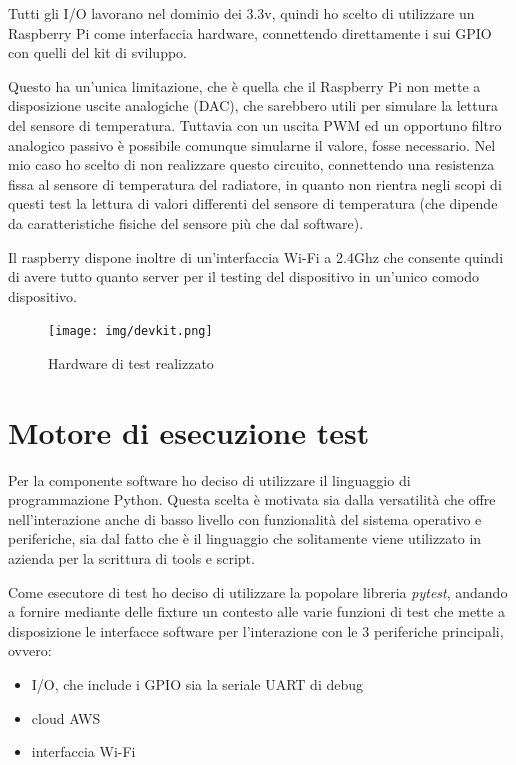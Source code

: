 \documentclass[12pt,a4paper,twoside,titlepage]{book}
\begin{document}
Tutti gli I/O lavorano nel dominio dei 3.3v, quindi ho scelto di utilizzare un
Raspberry Pi come interfaccia hardware, connettendo direttamente i sui GPIO con
quelli del kit di sviluppo.

Questo ha un'unica limitazione, che è quella che il Raspberry Pi non mette a disposizione
uscite analogiche (DAC), che sarebbero utili per simulare la lettura del sensore di
temperatura. Tuttavia con un uscita PWM ed un opportuno filtro analogico passivo è
possibile comunque simularne il valore, fosse necessario. Nel mio caso ho scelto di
non realizzare questo circuito, connettendo una resistenza fissa al sensore di
temperatura del radiatore, in quanto non rientra negli scopi di questi test la lettura
di valori differenti del sensore di temperatura (che dipende da caratteristiche fisiche
del sensore più che dal software).

Il raspberry dispone inoltre di un'interfaccia Wi-Fi a 2.4Ghz che consente quindi di
avere tutto quanto server per il testing del dispositivo in un'unico comodo dispositivo.

\begin{figure}
    \centering
    \texttt{[image: img/devkit.png]}
    \caption{Hardware di test realizzato}
    \label{fig:quadretto}
\end{figure}

\section{Motore di esecuzione test}

Per la componente software ho deciso di utilizzare il linguaggio di programmazione
Python. Questa scelta è motivata sia dalla versatilità che offre nell'interazione anche
di basso livello con funzionalità del sistema operativo e periferiche, sia dal fatto
che è il linguaggio che solitamente viene utilizzato in azienda per la scrittura di
tools e script.

Come esecutore di test ho deciso di utilizzare la popolare libreria \textit{pytest},
andando a fornire mediante delle fixture un contesto alle varie funzioni di test che
mette a disposizione le interfacce software per l'interazione con le 3 periferiche
principali, ovvero:

\begin{itemize}
    \item I/O, che include i GPIO sia la seriale UART di debug
    \item cloud AWS
    \item interfaccia Wi-Fi
\end{itemize}
\end{document}
